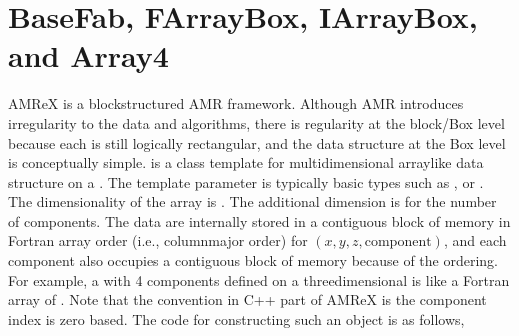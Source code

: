 \documentclass[letterpaper,10pt,english]{sphinxmanual}
\begin{document}
\section{BaseFab, FArrayBox, IArrayBox, and Array4}
\label{\detokenize{Basics:basefab-farraybox-iarraybox-and-array4}}\label{\detokenize{Basics:sec-basics-fab}}
\sphinxAtStartPar
AMReX is a block\sphinxhyphen{}structured AMR framework. Although AMR introduces irregularity
to the data and algorithms, there is regularity at the block/Box level because
each is still logically rectangular, and the data structure at the Box level is
conceptually simple.  is a class template for multi\sphinxhyphen{}dimensional
array\sphinxhyphen{}like data structure on a . The template parameter is typically
basic types such as ,  or . The dimensionality
of the array is  . The additional dimension is for
the number of components. The data are internally stored in a contiguous block
of memory in Fortran array order (i.e., column\sphinxhyphen{}major order) for
\((x,y,z,\mathrm{component})\), and each component also occupies a
contiguous block of memory because of the ordering. For example, a
 with 4 components defined on a three\sphinxhyphen{}dimensional
 is like a Fortran array of
.  Note that the
convention in C++ part of AMReX is the component index is zero based. The code
for constructing such an object is as follows,
\end{document}
